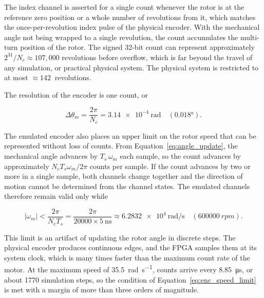 The index channel is asserted for a single count whenever the rotor is at the reference zero position or a whole number of revolutions from it, which matches the once-per-revolution index pulse of the physical encoder. With the mechanical angle not being wrapped to a single revolution, the count accumulates the multi-turn position of the rotor. The signed 32-bit count can represent approximately $2^{31}/N_c \approx 107{,}000$ revolutions before overflow, which is far beyond the travel of any simulation, or practical physical system. The physical system is restricted to at most $ \approx \SI{142}{}$ revolutions. 

The resolution of the encoder is one count, or

\begin{equation}
	\Delta\theta_m = \frac{2\pi}{N_c} = \SI{3.14e-4}{\radian}
	\quad (\ang{0.018}).
	\label{eq:enc_resolution}
\end{equation}


The emulated encoder also places an upper limit on the rotor speed that can be represented without loss of counts. From Equation~\eqref{eq:angle_update}, the mechanical angle advances by $T_s\,\omega_m$ each sample, so the count advances by approximately $N_c T_s \omega_m / 2\pi$ counts per sample. If the count advances by two or more in a single sample, both channels change together and the direction of motion cannot be determined from the channel states. The emulated channels therefore remain valid only while


\begin{equation}
	\left| \omega_m \right| < \frac{2\pi}{N_c T_s}
	= \frac{2\pi}{20000 \times \SI{5}{\nano\second}}
	\approx \SI{6.2832e4}{\radian\per\second} \quad (\SI{600000}{rpm}).
	\label{eq:enc_speed_limit}
\end{equation}

This limit is an artifact of updating the rotor angle in discrete steps. The physical encoder produces continuous edges, and the FPGA samples them at its system clock, which is many times faster than the maximum count rate of the motor.
At the maximum speed of \SI{35.5}{\radian\per\second}, counts arrive every \SI{8.85}{\micro\second}, or about 1770 simulation steps, so the condition of Equation~\eqref{eq:enc_speed_limit} is met with a margin of more than three orders of magnitude. 


